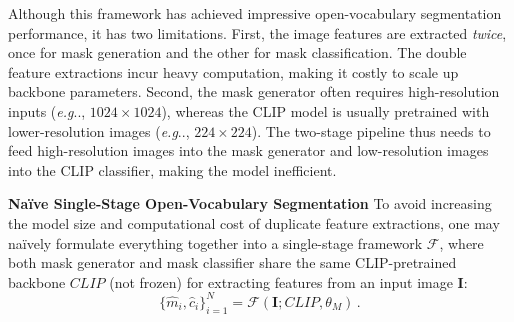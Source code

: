 \documentclass{article}
\makeatletter
\DeclareRobustCommand\onedot{\futurelet\@let@token\@onedot}
\def\@onedot{\ifx\@let@token.\else.\null\fi\xspace}
\def\eg{\emph{e.g}\onedot}
\makeatother
\begin{document}
Although this framework has achieved impressive open-vocabulary segmentation performance, it has two limitations.
First, the image features are extracted \textit{twice}, once for mask generation and the other for mask classification.
The double feature extractions incur heavy computation, making it costly to scale up backbone parameters.
Second, the mask generator often requires high-resolution inputs (\eg, $1024\times1024$), whereas the CLIP model is usually pretrained with lower-resolution images (\eg, $224\times224$).
The two-stage pipeline thus needs to feed high-resolution images into the mask generator and low-resolution images into the CLIP classifier, making the model inefficient.

\noindent \textbf{Na\"ive Single-Stage Open-Vocabulary Segmentation}\quad
To avoid increasing the model size and computational cost of duplicate feature extractions, one may na\"ively formulate everything together into a single-stage framework $\mathcal{F}$, where both mask generator and mask classifier share the same CLIP-pretrained backbone $CLIP$ (not frozen) for extracting features from an input image $\mathbf{I}$:
\begin{equation}
\{\hat{m}_i, \hat{c}_i\}_{i=1}^N = \mathcal{F}(\mathbf{I}; CLIP, \theta_M) \,.
\end{equation}
\end{document}
